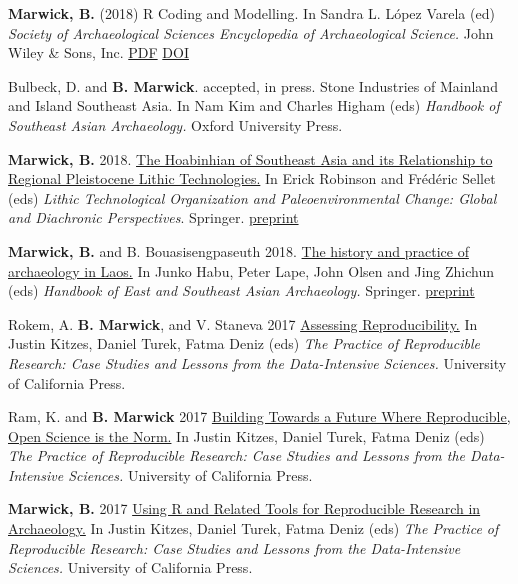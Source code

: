 \documentclass[11pt,article,oneside]{memoir}
\begin{document}
{{{{\ind \textbf{Marwick, B.} (2018) R Coding and Modelling. In Sandra L. López Varela (ed) \textit{Society of Archaeological Sciences Encyclopedia of Archaeological Science.}  John Wiley \& Sons, Inc. \href{http://faculty.washington.edu/bmarwick/PDFs/Marwick-2018-R-Coding-and-Modeling-The-Encyclopedia-of-Archaeological-Sciences.pdf}{PDF} \href{https://doi.org/10.1002/9781119188230.saseas0631}{DOI}

\ind Bulbeck, D. and \textbf{B. Marwick}. accepted, in press. Stone Industries of Mainland and Island Southeast Asia. In Nam Kim and Charles Higham (eds) \textit{Handbook of Southeast Asian Archaeology.} Oxford University Press.

\ind \textbf{Marwick, B.} 2018. \href{https://doi.org/10.1007/978-3-319-64407-3_4}{The Hoabinhian of Southeast Asia and its Relationship to Regional Pleistocene Lithic Technologies.} In Erick Robinson and Frédéric Sellet (eds) \textit{Lithic Technological Organization and Paleoenvironmental Change: Global and Diachronic Perspectives}. Springer. \href{https://doi.org/10.17605/OSF.IO/9PT8G}{preprint}

\ind \textbf{Marwick, B.} and B. Bouasisengpaseuth 2018. \href{https://doi.org/10.1007/978-1-4939-6521-2_8}{The history and practice of archaeology in Laos.} In Junko Habu, Peter Lape, John Olsen and Jing Zhichun (eds) \textit{ Handbook of East and Southeast Asian Archaeology.} Springer. \href{https://dx.doi.org/10.17605/OSF.IO/75ZHC}{preprint}

\ind Rokem, A. \textbf{B. Marwick}, and V. Staneva 2017 \href{https://www.practicereproducibleresearch.org/core-chapters/2-assessment.html}{Assessing Reproducibility.} In Justin Kitzes, Daniel Turek, Fatma Deniz (eds) \textit{The Practice of Reproducible Research: Case Studies and Lessons from the Data-Intensive Sciences.} University of California Press.

\ind Ram, K. and \textbf{B. Marwick} 2017 \href{https://www.practicereproducibleresearch.org/core-chapters/6-future.html}{Building Towards a Future Where Reproducible, Open Science is the Norm.} In Justin Kitzes, Daniel Turek, Fatma Deniz (eds) \textit{The Practice of Reproducible Research: Case Studies and Lessons from the Data-Intensive Sciences.} University of California Press.

\ind \textbf{Marwick, B.} 2017 \href{https://www.practicereproducibleresearch.org/case-studies/benmarwick.html}{Using R and Related Tools for Reproducible Research in Archaeology.} In Justin Kitzes, Daniel Turek, Fatma Deniz (eds) \textit{The Practice of Reproducible Research: Case Studies and Lessons from the Data-Intensive Sciences.} University of California Press. 

}}}}
\end{document}
